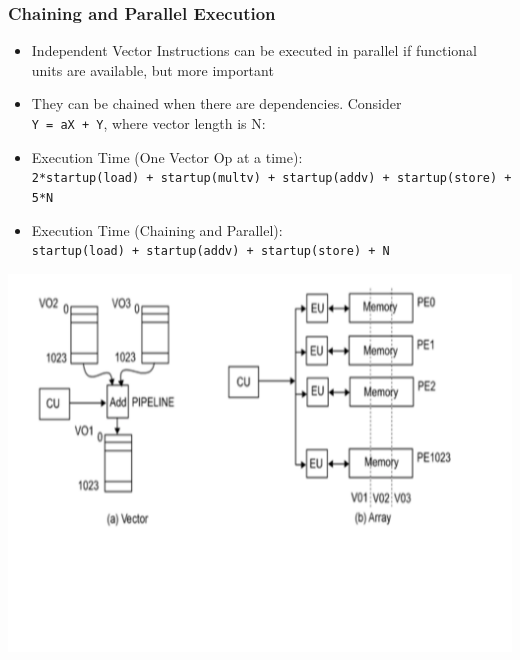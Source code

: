 \documentclass{beamer}
\begin{document}
\begin{frame}[fragile,t]
\frametitle{Chaining and Parallel Execution}

\begin{itemize}
    \item Independent Vector Instructions can be executed in parallel
            if functional units are available, but more important\smallskip
    \item They can be chained when there are dependencies. 
            Consider\\ {\tt Y = aX + Y}, where vector length is N:\smallskip

    \item Execution Time (One Vector Op at a time):\\
            {\tt 2*startup(load) + startup(multv) + startup(addv) + 
                    startup(store) + 5*N}\smallskip

    \item Execution Time (Chaining and Parallel):\\
            {\tt startup(load) + startup(addv) + startup(store) + N} 
\end  {itemize}

\includegraphics[width=59ex]{Ch1Figs/VectorMachine}

\end{frame}
\end{document}
